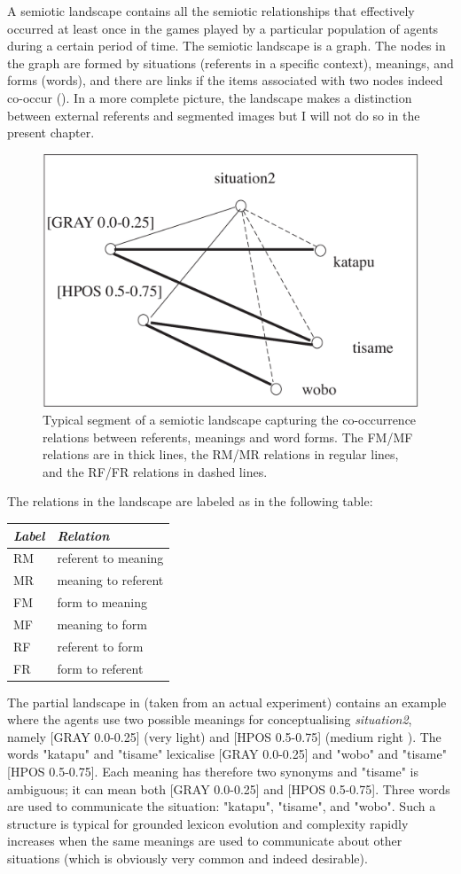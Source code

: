 A semiotic landscape contains all the semiotic relationships
that effectively occurred at least once
in the games played by a particular population of agents
during a certain period of time. 
The semiotic landscape is a graph. The nodes in the
graph are formed by situations (referents in a specific context), 
meanings, and forms (words),
and there are links if the items associated with two nodes
indeed co-occur (). In a more complete
picture, the landscape makes a distinction between 
external referents and segmented images but I will not 
do so in the present chapter. 
\begin{figure}[htbp]
  \centerline{\includegraphics[width=.65\textwidth]{chap7/figs/landscape}}
\caption{ \label{RMF1} Typical segment of a semiotic
landscape capturing the co-occurrence relations between
referents, meanings and word forms. The FM/MF relations are
in thick lines, the RM/MR relations in regular lines, and 
the RF/FR relations in dashed lines.}
\end{figure}
The relations in the landscape are labeled as in 
the following table:
\begin{center}
\begin{tabular}{ l  l  } \midrule
{\it Label}& {\it Relation } \\ \midrule
RM & referent to meaning \\ \midrule
MR & meaning to referent \\ \midrule
FM & form to meaning\\ \midrule
MF & meaning to form\\ \midrule
RF & referent to form \\ \midrule
FR & form to referent  \\ \midrule
\end{tabular}
\end{center}

The partial landscape in  (taken from
an actual experiment) contains an example where the agents use
two possible meanings for conceptualising {\it situation2}, namely
[GRAY 0.0-0.25] (very light) and [HPOS 0.5-0.75]
(medium right ). The words "katapu" and "tisame" lexicalise
[GRAY 0.0-0.25] and "wobo" and "tisame" [HPOS 0.5-0.75]. 
Each meaning has therefore two synonyms and "tisame" is 
ambiguous; it can mean both [GRAY 0.0-0.25]
and [HPOS 0.5-0.75]. Three words
are used to communicate the situation: "katapu", "tisame", 
and "wobo". Such a structure is typical for grounded
lexicon evolution and complexity rapidly increases when the
same meanings are used to communicate about other
situations (which is obviously very common and indeed desirable). 

